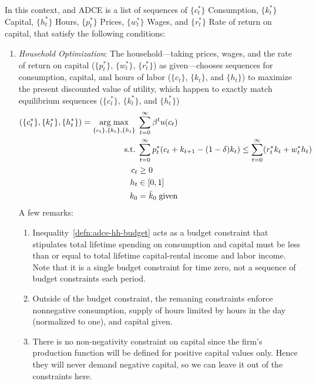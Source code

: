 \documentclass[12pt]{article}
\theoremstyle{plain}
\theoremstyle{definition}
\theoremstyle{remark}
\DeclareMathOperator*{\argmax}{arg\;max}
\newcommand{\sumtinfz}{\sum^\infty_{t=0}}
\begin{document}
In this context, and ADCE is a list of sequences of
$\{c_t^*\}$  Consumption,
$\{k_t^*\}$  Capital,
$\{h_t^*\}$  Hours,
$\{p_t^*\}$  Prices,
$\{w_t^*\}$  Wages, and
$\{r_t^*\}$  Rate of return on capital,
that satisfy the following conditions:
\begin{enumerate}
  \item \emph{Household Optimization}: The household---taking prices,
    wages, and the rate of return on capital
    ($\{p^*_t\}$, $\{w^*_t\}$, $\{r^*_t\}$) as given---chooses
    sequences for consumption, capital, and hours of labor
    ($\{c_t\}$, $\{k_t\}$, and $\{h_t\}$)
    to maximize the present discounted value of utility, which happen to
    exactly match equilibrium sequences
    ($\{c_t^*\}$, $\{k_t^*\}$, and $\{h_t^*\}$)
    \begin{align}
      (\{c_t^*\}, \{k_t^*\}, \{h_t^*\})
      =
      \argmax_{\{c_t\}, \{k_t\}, \{h_t\}}
        \; &\sumtinfz \beta^t u(c_t)
        \label{defn:adce-hh-objfcn}\\
      \text{s.t.} \; &
        \sumtinfz p^*_t(c_t + k_{t+1}-(1-\delta)k_t) \leq
        \sumtinfz (r^*_t k_t + w^*_t h_t)
        \label{defn:adce-hh-budget}\\
      c_t &\geq 0 \notag\\
      h_t &\in [0,1] \notag\\
      k_0 &= \bar{k}_0 \; \text{given} \notag
    \end{align}
    A few remarks:
    \begin{enumerate}
      \item Inequality~\ref{defn:adce-hh-budget} acts as a budget
        constraint that stipulates total lifetime spending on
        consumption and capital must be less than or equal to total
        lifetime capital-rental income and labor income. Note that it is
        a single budget constraint for time zero, not a sequence of
        budget constraints each period.

      \item Outside of the budget constraint, the remaning constraints
        enforce nonnegative consumption, supply of hours limited by
        hours in the day (normalized to one), and capital given.

      \item There is no non-negativity constraint on capital since the
        firm's production function will be defined for positive capital
        values only. Hence they will never demand negative capital, so
        we can leave it out of the constraints here.


\end{enumerate}
\end{enumerate}
\end{document}
